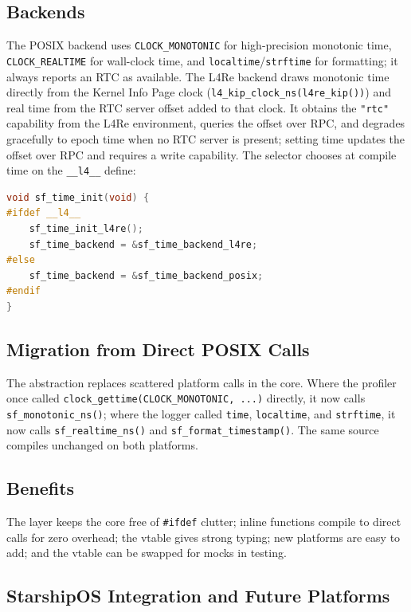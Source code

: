\subsection{Backends}

The POSIX backend uses \texttt{CLOCK\_MONOTONIC} for high-precision monotonic
time, \texttt{CLOCK\_REALTIME} for wall-clock time, and
\texttt{localtime}/\texttt{strftime} for formatting; it always reports an RTC
as available. The L4Re backend draws monotonic time directly from the Kernel
Info Page clock (\texttt{l4\_kip\_clock\_ns(l4re\_kip())}) and real time from
the RTC server offset added to that clock. It obtains the \texttt{"rtc"}
capability from the L4Re environment, queries the offset over RPC, and degrades
gracefully to epoch time when no RTC server is present; setting time updates the
offset over RPC and requires a write capability. The selector chooses at
compile time on the \texttt{\_\_l4\_\_} define:

\begin{lstlisting}[language=C]
void sf_time_init(void) {
#ifdef __l4__
    sf_time_init_l4re();
    sf_time_backend = &sf_time_backend_l4re;
#else
    sf_time_backend = &sf_time_backend_posix;
#endif
}
\end{lstlisting}

\subsection{Migration from Direct POSIX Calls}

The abstraction replaces scattered platform calls in the core. Where the
profiler once called \texttt{clock\_gettime(CLOCK\_MONOTONIC, ...)} directly, it
now calls \texttt{sf\_monotonic\_ns()}; where the logger called \texttt{time},
\texttt{localtime}, and \texttt{strftime}, it now calls
\texttt{sf\_realtime\_ns()} and \texttt{sf\_format\_timestamp()}. The same
source compiles unchanged on both platforms.

\subsection{Benefits}

The layer keeps the core free of \texttt{\#ifdef} clutter; inline functions
compile to direct calls for zero overhead; the vtable gives strong typing; new
platforms are easy to add; and the vtable can be swapped for mocks in testing.

\subsection{StarshipOS Integration and Future Platforms}

